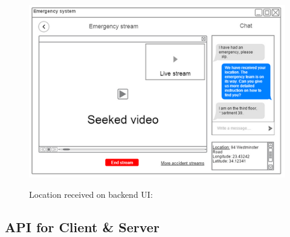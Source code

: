 \documentclass{article}
\begin{document}
	
	\begin{figure}[h]
		\centering
		\includegraphics[width=.8\textwidth]{"Auto/5"}

		Location received on backend UI:
	\vspace{-30pt}
	\end{figure} \clearpage
	
		
	
	
    \subsection{API for Client \& Server}
\begin{figure}[htp] \centering{
}
\end{figure}
\pagebreak

    
    


	
	
\end{document}
